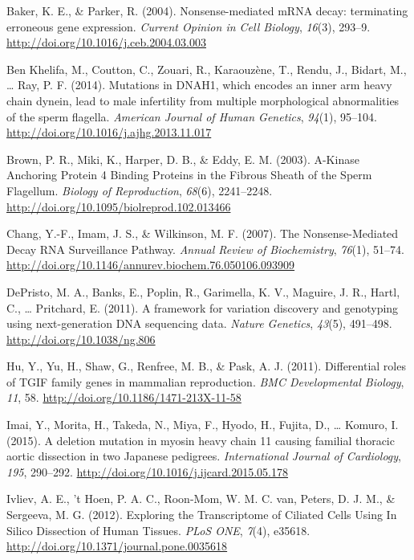 \documentclass[12pt,twoside]{reedthesis}
\theoremstyle{definition}
\theoremstyle{definition}
\theoremstyle{remark}
\begin{document}
  \hypertarget{ref-Baker2004}{}
  Baker, K. E., \& Parker, R. (2004). Nonsense-mediated mRNA decay:
  terminating erroneous gene expression. \emph{Current Opinion in Cell
  Biology}, \emph{16}(3), 293--9.
  \url{http://doi.org/10.1016/j.ceb.2004.03.003}
  
  \hypertarget{ref-BenKhelifa2014}{}
  Ben Khelifa, M., Coutton, C., Zouari, R., Karaouzène, T., Rendu, J.,
  Bidart, M., \ldots{} Ray, P. F. (2014). Mutations in DNAH1, which
  encodes an inner arm heavy chain dynein, lead to male infertility from
  multiple morphological abnormalities of the sperm flagella.
  \emph{American Journal of Human Genetics}, \emph{94}(1), 95--104.
  \url{http://doi.org/10.1016/j.ajhg.2013.11.017}
  
  \hypertarget{ref-Brown2003}{}
  Brown, P. R., Miki, K., Harper, D. B., \& Eddy, E. M. (2003). A-Kinase
  Anchoring Protein 4 Binding Proteins in the Fibrous Sheath of the Sperm
  Flagellum. \emph{Biology of Reproduction}, \emph{68}(6), 2241--2248.
  \url{http://doi.org/10.1095/biolreprod.102.013466}
  
  \hypertarget{ref-Chang2007}{}
  Chang, Y.-F., Imam, J. S., \& Wilkinson, M. F. (2007). The
  Nonsense-Mediated Decay RNA Surveillance Pathway. \emph{Annual Review of
  Biochemistry}, \emph{76}(1), 51--74.
  \url{http://doi.org/10.1146/annurev.biochem.76.050106.093909}
  
  \hypertarget{ref-DePristo2011}{}
  DePristo, M. A., Banks, E., Poplin, R., Garimella, K. V., Maguire, J.
  R., Hartl, C., \ldots{} Pritchard, E. (2011). A framework for variation
  discovery and genotyping using next-generation DNA sequencing data.
  \emph{Nature Genetics}, \emph{43}(5), 491--498.
  \url{http://doi.org/10.1038/ng.806}
  
  \hypertarget{ref-Hu2011}{}
  Hu, Y., Yu, H., Shaw, G., Renfree, M. B., \& Pask, A. J. (2011).
  Differential roles of TGIF family genes in mammalian reproduction.
  \emph{BMC Developmental Biology}, \emph{11}, 58.
  \url{http://doi.org/10.1186/1471-213X-11-58}
  
  \hypertarget{ref-Imai2015}{}
  Imai, Y., Morita, H., Takeda, N., Miya, F., Hyodo, H., Fujita, D.,
  \ldots{} Komuro, I. (2015). A deletion mutation in myosin heavy chain 11
  causing familial thoracic aortic dissection in two Japanese pedigrees.
  \emph{International Journal of Cardiology}, \emph{195}, 290--292.
  \url{http://doi.org/10.1016/j.ijcard.2015.05.178}
  
  \hypertarget{ref-Ivliev2012}{}
  Ivliev, A. E., 't Hoen, P. A. C., Roon-Mom, W. M. C. van, Peters, D. J.
  M., \& Sergeeva, M. G. (2012). Exploring the Transcriptome of Ciliated
  Cells Using In Silico Dissection of Human Tissues. \emph{PLoS ONE},
  \emph{7}(4), e35618. \url{http://doi.org/10.1371/journal.pone.0035618}
  
\end{document}

